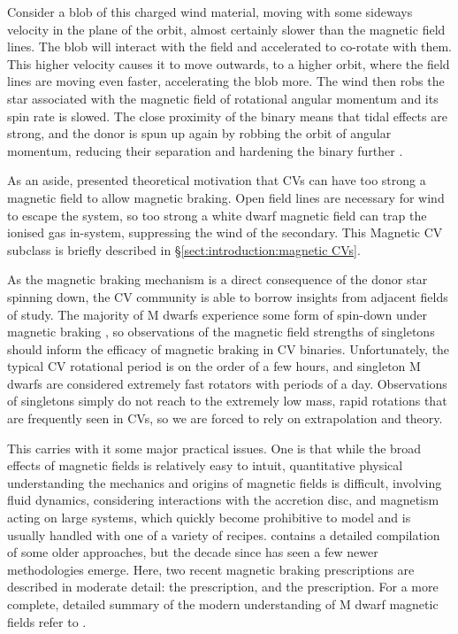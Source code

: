 Consider a blob of this charged wind material, moving with some sideways velocity in the plane of the orbit, almost certainly slower than the magnetic field lines. 
The blob will interact with the field and accelerated to co-rotate with them.
This higher velocity causes it to move outwards, to a higher orbit, where the field lines are moving even faster, accelerating the blob more. 
The wind then robs the star associated with the magnetic field of rotational angular momentum and its spin rate is slowed. The close proximity of the binary means that tidal effects are strong, and the donor is spun up again by robbing the orbit of angular momentum, reducing their separation and hardening the binary further \citep{verbunt1981}.

As an aside, \citet{wickramasinghe1996} presented theoretical motivation that CVs can have too strong a magnetic field to allow magnetic braking. Open field lines are necessary for wind to escape the system, so too strong a white dwarf magnetic field can trap the ionised gas in-system, suppressing the wind of the secondary. This Magnetic CV subclass is briefly described in \S\ref{sect:introduction:magnetic CVs}.

As the magnetic braking mechanism is a direct consequence of the donor star spinning down, the CV community is able to borrow insights from adjacent fields of study. The majority of M dwarfs experience some form of spin-down under magnetic braking , so observations of the magnetic field strengths of singletons should inform the efficacy of magnetic braking in CV binaries. Unfortunately, the typical CV rotational period is on the order of a few hours, and singleton M dwarfs are considered extremely fast rotators with periods of a day. Observations of singletons simply do not reach to the extremely low mass, rapid rotations that are frequently seen in CVs, so we are forced to rely on extrapolation and theory.

This carries with it some major practical issues. One is that while the broad effects of magnetic fields is relatively easy to intuit, quantitative physical understanding the mechanics and origins of magnetic fields is difficult, involving fluid dynamics, considering interactions with the accretion disc, and magnetism acting on large systems, which quickly become prohibitive to model and is usually handled with one of a variety of recipes. \citealt{knigge11} contains a detailed compilation of some older approaches, but the decade since has seen a few newer methodologies emerge. Here, two recent magnetic braking prescriptions are described in moderate detail: the \citet{matt2015} prescription, and the \citet{garraffo2018a} prescription. For a more complete, detailed summary of the modern understanding of M dwarf magnetic fields refer to \citet{kochukhov2021}. 


